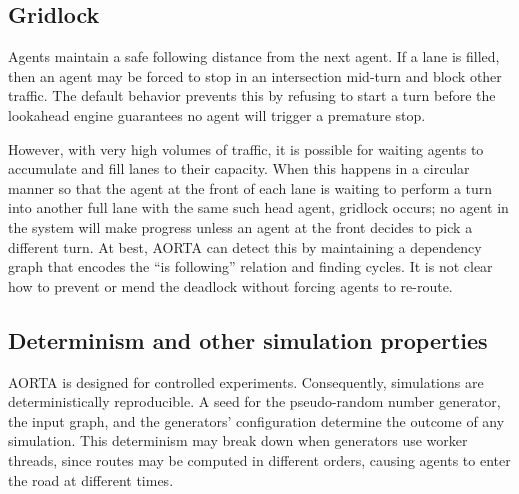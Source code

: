 \documentclass[letterpaper, 10 pt, conference]{ieeeconf}  %
\begin{document}
\subsection{Gridlock}

Agents maintain a safe following distance from the next agent. If a lane is
filled, then an agent may be forced to stop in an intersection mid-turn and
block other traffic. The default behavior prevents this by refusing to start a
turn before the lookahead engine guarantees no agent will trigger a premature
stop.


However, with very high volumes of traffic, it is possible for waiting agents to
accumulate and fill lanes to their capacity. When this happens in a circular
manner so that the agent at the front of each lane is waiting to perform a turn
into another full lane with the same such head agent, gridlock occurs; no agent
in the system will make progress unless an agent at the front decides to pick a
different turn. At best, AORTA can detect this by maintaining a dependency graph
that encodes the ``is following'' relation and finding cycles. It is not clear
how to prevent or mend the deadlock without forcing agents to re-route.


\subsection{Determinism and other simulation properties}

AORTA is designed for controlled experiments. Consequently, simulations are
deterministically reproducible. A seed for the pseudo-random number generator,
the input graph, and the generators' configuration determine the outcome of any
simulation. This determinism may break down when generators use worker threads,
since routes may be computed in different orders, causing agents to enter the
road at different times.



 
\end{document}
